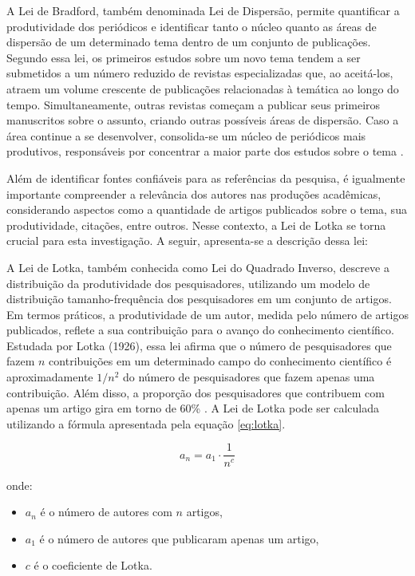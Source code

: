 \documentclass[openany,oneside,a4paper,11pt]{extarticle}
\begin{document}
A Lei de Bradford, também denominada Lei de Dispersão, permite quantificar a produtividade dos periódicos e identificar tanto o núcleo quanto as áreas de dispersão de um determinado tema dentro de um conjunto de publicações. Segundo essa lei, os primeiros estudos sobre um novo tema tendem a ser submetidos a um número reduzido de revistas especializadas que, ao aceitá-los, atraem um volume crescente de publicações relacionadas à temática ao longo do tempo. Simultaneamente, outras revistas começam a publicar seus primeiros manuscritos sobre o assunto, criando outras possíveis áreas de dispersão. Caso a área continue a se desenvolver, consolida-se um núcleo de periódicos mais produtivos, responsáveis por concentrar a maior parte dos estudos sobre o tema \cite{lousada2012produccao}.

Além de identificar fontes confiáveis para as referências da pesquisa, é igualmente importante compreender a relevância dos autores nas produções acadêmicas, considerando aspectos como a quantidade de artigos publicados sobre o tema, sua produtividade, citações, entre outros. Nesse contexto, a Lei de Lotka se torna crucial para esta investigação. A seguir, apresenta-se a descrição dessa lei:

A Lei de Lotka, também conhecida como Lei do Quadrado Inverso, descreve a distribuição da produtividade dos pesquisadores, utilizando um modelo de distribuição tamanho-frequência dos pesquisadores em um conjunto de artigos. Em termos práticos, a produtividade de um autor, medida pelo número de artigos publicados, reflete a sua contribuição para o avanço do conhecimento científico. Estudada por Lotka (1926), essa lei afirma que o número de pesquisadores que fazem $n$ contribuições em um determinado campo do conhecimento científico é aproximadamente $1/n^2
$ do número de pesquisadores que fazem apenas uma contribuição. Além disso, a proporção dos pesquisadores que contribuem com apenas um artigo gira em torno de 60\% \cite{melo2017bibliometria}. A Lei de Lotka pode ser calculada utilizando a fórmula apresentada pela equação \ref{eq:lotka}.

\begin{equation}
a_n = a_1 \cdot \frac{1}{n^c}
\label{eq:lotka}
\end{equation}

onde:
\begin{itemize}
    \item \( a_n \) é o número de autores com \( n \) artigos,
    \item \( a_1 \) é o número de autores que publicaram apenas um artigo,
    \item \( c \) é o coeficiente de Lotka.
\end{itemize}
\end{document}
